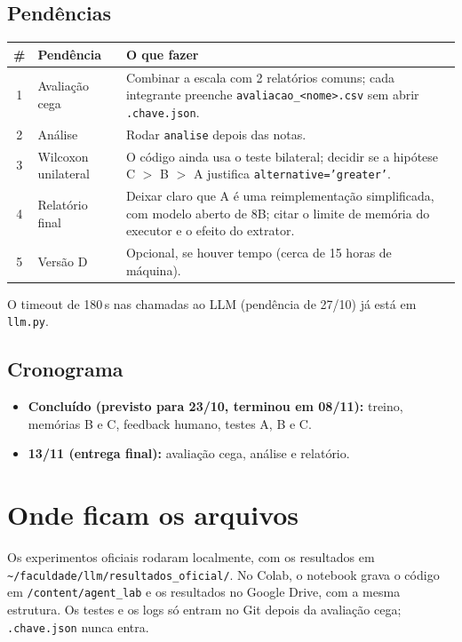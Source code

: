 \documentclass[11pt,a4paper]{article}
\begin{document}
\subsection{Pendências}

\begin{center}
\small
\begin{tabularx}{\textwidth}{clX}
\toprule
\# & Pendência & O que fazer \\
\midrule
1 & Avaliação cega & Combinar a escala com 2 relatórios comuns; cada integrante preenche
    \texttt{avaliacao\_<nome>.csv} sem abrir \texttt{.chave.json}. \\
2 & Análise & Rodar \texttt{analise} depois das notas. \\
3 & Wilcoxon unilateral & O código ainda usa o teste bilateral; decidir se a hipótese
    C $>$ B $>$ A justifica \texttt{alternative='greater'}. \\
4 & Relatório final & Deixar claro que A é uma reimplementação simplificada, com modelo aberto
    de 8B; citar o limite de memória do executor e o efeito do extrator. \\
5 & Versão D & Opcional, se houver tempo (cerca de 15 horas de máquina). \\
\bottomrule
\end{tabularx}
\end{center}

O timeout de 180\,s nas chamadas ao LLM (pendência de 27/10) já está em \texttt{llm.py}.

\subsection{Cronograma}

\begin{itemize}
  \item \textbf{Concluído (previsto para 23/10, terminou em 08/11):} treino, memórias B e C,
        feedback humano, testes A, B e C.
  \item \textbf{13/11 (entrega final):} avaliação cega, análise e relatório.
\end{itemize}

\appendix
\section{Onde ficam os arquivos}

Os experimentos oficiais rodaram localmente, com os resultados em
\texttt{\textasciitilde/faculdade/llm/resultados\_oficial/}. No Colab, o notebook grava o
código em \texttt{/content/agent\_lab} e os resultados no Google Drive, com a mesma estrutura.
Os testes e os logs só entram no Git depois da avaliação cega; \texttt{.chave.json} nunca entra.
\end{document}
